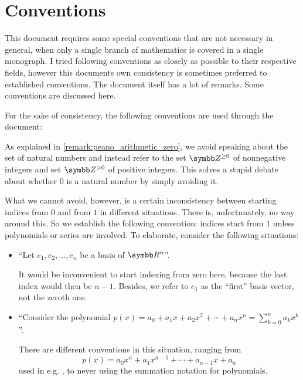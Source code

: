 \section{Conventions}\label{sec:conventions}

This document requires some special conventions that are not necessary in general, when only a single branch of mathematics is covered in a single monograph. I tried following conventions as closely as possible to their respective fields, however this documents own consistency is sometimes preferred to established conventions. The document itself has a lot of remarks. Some conventions are discussed here.

For the sake of consistency, the following conventions are used through the document:
\begin{enumerate}
   As explained in \cref{remark:peano_arithmetic_zero}, we avoid speaking about the set of natural numbers and instead refer to the set \( \Z^{\geq 0} \) of nonnegative integers and set \( \Z^{>0} \) of positive integers. This solves a stupid debate about whether \( 0 \) is a natural number by simply avoiding it.

   What we cannot avoid, however, is a certain inconsistency between starting indices from \( 0 \) and from \( 1 \) in different situations. There is, unfortunately, no way around this. So we establish the following convention: indices start from \( 1 \) unless polynomials or series are involved. To elaborate, consider the following situations:

  \begin{itemize}
    \item \enquote{Let \( e_1, e_2, \ldots, e_n \) be a basis of \( \R^n \)}.

    It would be inconvenient to start indexing from zero here, because the last index would then be \( n - 1 \). Besides, we refer to \( e_1 \) as the \enquote{first} basis vector, not the zeroth one.

    \item \enquote{Consider the polynomial \( p(x) = a_0 + a_1 x + a_2 x^2 + \cdots + a_n x^n = \sum_{k=0}^n a_k x^k \)}.

    There are different conventions in this situation, ranging from
    \begin{equation*}
      p(x) = a_0 x^n + a_1 x^{n-1} + \cdots + a_{n-1} x + a_n
    \end{equation*}
    used in e.g. \cite[3]{Боянов2008}, to never using the summation notation for polynomials.


\end{itemize}
\end{enumerate}
